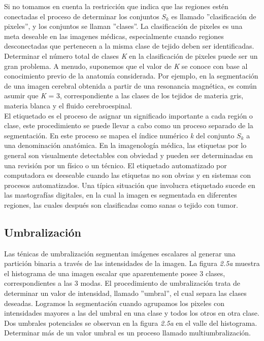 \documentclass[12pt]{report}
\begin{document}
Si no tomamos en cuenta la restricción que indica que las regiones estén conectadas el proceso de determinar los conjuntos $S_{k}$ es llamado ''clasificación de pixeles'', y los conjuntos se llaman ''clases''. La clasificación de pixeles es una meta deseable en las imagenes médicas, especialmente cuando regiones desconectadas que pertenecen a la misma clase de tejido deben ser identificadas. Determinar el número total  de clases \textit{K} en la clasificación de pixeles puede ser un gran problema. A menudo, suponemos que el valor de \textit{K} se conoce con base al conocimiento previo de la anatomía considerada. Por ejemplo, en la segmentación de una imagen cerebral obtenida a partir de una resonancia magnética, es común asumir que \textit{K} = 3, correspondiente a las clases de los tejidos de materia gris, materia blanca y el fluido cerebroespinal.\\

El etiquetado es el proceso de asignar un significado importante a cada región o clase, este procedimiento se puede llevar a cabo como un proceso separado de la segmentación. En este proceso se mapea el índice numérico \textit{k} del conjunto $S_{k}$ a una denominación anatómica. En la imagenología médica, las etiquetas por lo general son visualmente detectables con obviedad y pueden ser determinadas en una revisión por un físico o un técnico. El etiquetado automatizado por computadora es deeseable cuando las etiquetas no son obvias y en sistemas con procesos automatizados. Una típica situación que involucra etiquetado sucede en las mastografías digitales, en la cual la imagen es segmentada en diferentes regiones, las cuales después son clasificadas como sanas o tejido con tumor.\cite{metodos}

\subsection{Umbralización}
Las ténicas de umbralización segmentan imágenes escalares al generar una partición binaria a través de las intensidades de la imagen. La figura \textit{2.5a} muestra el histograma de una imagen escalar que aparentemente posee 3 clases, correspondientes a las 3 modas. El procedimiento de umbralización trata de determinar un valor de intensidad, llamado ''umbral'', el cual separa las clases deseadas. Logramos la segmentación cuando agrupamos los pixeles con intensidades mayores a las del umbral en una clase y todos los otros en otra clase. Dos umbrales potenciales se observan en la figura \textit{2.5a} en el valle del histograma. Determinar más de un valor umbral es un proceso llamado multiumbralización.\\
\end{document}
